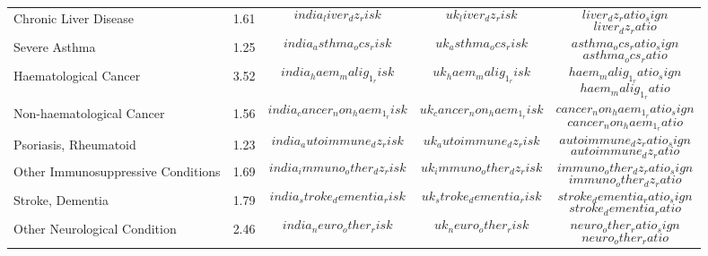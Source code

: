 \begin{tabular}{p{6cm}p{1.5cm}p{2cm}p{2cm}|p{4cm}}
Chronic Liver Disease & 1.61 & $$india_liver_dz_risk$$ & $$uk_liver_dz_risk$$ & \hspace{4ex}$$liver_dz_ratio_sign$$$$liver_dz_ratio$$ \\[0.25ex]
Severe Asthma & 1.25 & $$india_asthma_ocs_risk$$ & $$uk_asthma_ocs_risk$$ & \hspace{4ex}$$asthma_ocs_ratio_sign$$$$asthma_ocs_ratio$$ \\[0.25ex]
Haematological Cancer & 3.52 & $$india_haem_malig_1_risk$$ & $$uk_haem_malig_1_risk$$ & \hspace{4ex}$$haem_malig_1_ratio_sign$$$$haem_malig_1_ratio$$ \\[0.25ex]
Non-haematological Cancer & 1.56 & $$india_cancer_non_haem_1_risk$$ & $$uk_cancer_non_haem_1_risk$$ & \hspace{4ex}$$cancer_non_haem_1_ratio_sign$$$$cancer_non_haem_1_ratio$$ \\[0.25ex]
Psoriasis, Rheumatoid & 1.23 & $$india_autoimmune_dz_risk$$ & $$uk_autoimmune_dz_risk$$ & \hspace{4ex}$$autoimmune_dz_ratio_sign$$$$autoimmune_dz_ratio$$ \\[0.25ex]
Other Immunosuppressive Conditions & 1.69 & $$india_immuno_other_dz_risk$$ & $$uk_immuno_other_dz_risk$$ & \hspace{4ex}$$immuno_other_dz_ratio_sign$$$$immuno_other_dz_ratio$$ \\[0.25ex]
Stroke, Dementia & 1.79 & $$india_stroke_dementia_risk$$ & $$uk_stroke_dementia_risk$$ & \hspace{4ex}$$stroke_dementia_ratio_sign$$$$stroke_dementia_ratio$$ \\[0.25ex]
Other Neurological Condition & 2.46 & $$india_neuro_other_risk$$ & $$uk_neuro_other_risk$$ & \hspace{4ex}$$neuro_other_ratio_sign$$$$neuro_other_ratio$$ \\[0.25ex]
\end{tabular}


